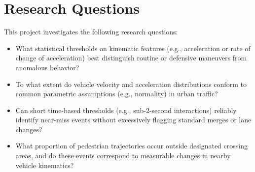 \documentclass[conference]{IEEEtran}
\begin{document}
\section{Research Questions}
This project investigates the following research questions:
\begin{itemize}
    \item What statistical thresholds on kinematic features (e.g., acceleration or rate of change of acceleration) best distinguish routine or defensive maneuvers from anomalous behavior?
    \item To what extent do vehicle velocity and acceleration distributions conform to common parametric assumptions (e.g., normality) in urban traffic?
    \item Can short time-based thresholds (e.g., sub-2-second interactions) reliably identify near-miss events without excessively flagging standard merges or lane changes?
    \item What proportion of pedestrian trajectories occur outside designated crossing areas, and do these events correspond to measurable changes in nearby vehicle kinematics?
\end{itemize}



\end{document}
